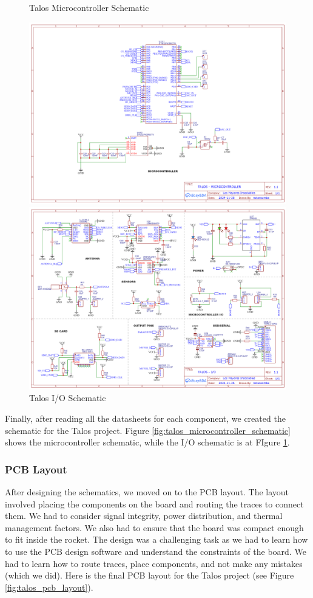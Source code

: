 \documentclass{article}
\begin{document}
\begin{figure}[h]
      \caption{Talos Microcontroller Schematic}
      \label{fig:talos_microcontroller_schematic}
      \centering
      \includegraphics[width=\textwidth]{Microcontroller.png}
      \caption{Talos I/O Schematic}
      \label{fig:talos_io_schematic}
      \centering
      \includegraphics[width=\textwidth]{IO.png}
\end{figure}
Finally, after reading all the datasheets for each component, we created the schematic for the Talos project. Figure \ref{fig:talos_microcontroller_schematic} shows the microcontroller schematic, while the I/O schematic is at FIgure \ref{fig:talos_io_schematic}.

\subsubsection{PCB Layout}
\qquad After designing the schematics, we moved on to the PCB layout. The layout involved placing the components on the board and routing the traces to connect them. We had to consider signal integrity, power distribution, and thermal management factors. We also had to ensure that the board was compact enough to fit inside the rocket. The design was a challenging task as we had to learn how to use the PCB design software and understand the constraints of the board. We had to learn how to route traces, place components, and not make any mistakes (which we did). Here is the final PCB layout for the Talos project (see Figure \ref{fig:talos_pcb_layout}).
\end{document}
